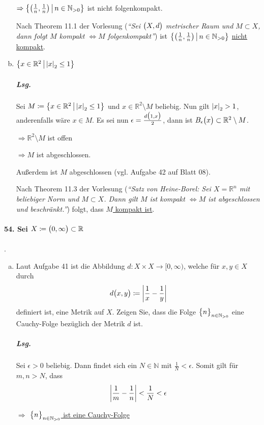 \documentclass{scrreprt}
\begin{document}
\begin{enumerate}[(a)]
  $\Rightarrow
  \qty{\qty(\frac{1}{n}, \frac{1}{n}) \,\middle |\, n \in \mathbb{N}_{> 0}}$
  ist nicht folgenkompakt.

  Nach Theorem 11.1 der Vorlesung (\emph{``Sei $\qty\big(X, d)$ metrischer Raum
    und $M \subset X$, dann folgt $M$ kompakt $\iff M$ folgenkompakt''})
  ist $\qty{\qty(\frac{1}{n}, \frac{1}{n}) \,\middle |\, n \in \mathbb{N}_{> 0}}$
  \underline{nicht kompakt}.

\item $\qty\big{x \in \mathbb{R}^2 \,{\big |}\, \abs{x}_2 \leq 1}$

  \subparagraph{Lsg.} Sei $M \coloneqq
  \qty\big{x \in \mathbb{R}^2 \,{\big |}\, \abs{x}_2 \leq 1}$ und
  $x \in \mathbb{R}^2 \setminus M$ beliebig.
  Nun gilt $\abs{x}_2 > 1$, anderenfalls wäre $x \in M$.
  Es sei nun $\epsilon = \frac{d\qty\big(1, x)}{2}$, dann ist
  $B_{\epsilon}\qty\big(x) \subset \mathbb{R}^2 \setminus M$.

  $\Rightarrow \mathbb{R}^2 \setminus M$ ist offen

  $\Rightarrow M$ ist abgeschlossen.

  Außerdem ist $M$ abgeschlossen (vgl. Aufgabe 42 auf Blatt 08).

  Nach Theorem 11.3 der Vorlesung (\emph{``Satz von Heine-Borel: Sei
    $X = \mathbb{R}^n$ mit beliebiger Norm und $M \subset X$.
    Dann gilt $M$ ist kompakt $\iff M$ ist abgeschlossen und beschränkt.''})
  folgt, dass \underline{$M$ kompakt ist}.
\end{enumerate}

\newpage
\paragraph{54. Sei $X \coloneqq \qty\big(0, \infty) \subset \mathbb{R}$}.
\begin{enumerate}[(a)]
\item Laut Aufgabe 41 ist die Abbildung
  $d \colon X \times X \to \big[0, \infty \big)$, welche für $x, y \in X$
  durch
  \[
    d\qty\big(x, y) \coloneqq \abs{\frac{1}{x} - \frac{1}{y}}
  \]
  definiert ist, eine Metrik auf $X$.
  Zeigen Sie, dass die Folge $\qty\big{n}_{n \in \mathbb{N}_{> 0}}$ eine
  Cauchy-Folge bezüglich der Metrik $d$ ist.

  \subparagraph{Lsg.} Sei $\epsilon > 0$ beliebig.
  Dann findet sich ein $N \in \mathbb{N}$ mit $\frac{1}{N} < \epsilon$.
  Somit gilt für $m, n > N$, dass
  \[
    \abs{\frac{1}{m} - \frac{1}{n}} < \frac{1}{N} < \epsilon
  \]

  $\Rightarrow$ \underline{$\qty\big{n}_{n \in \mathbb{N}_{> 0}}$ ist eine
  Cauchy-Folge}
\end{enumerate}
\end{document}
